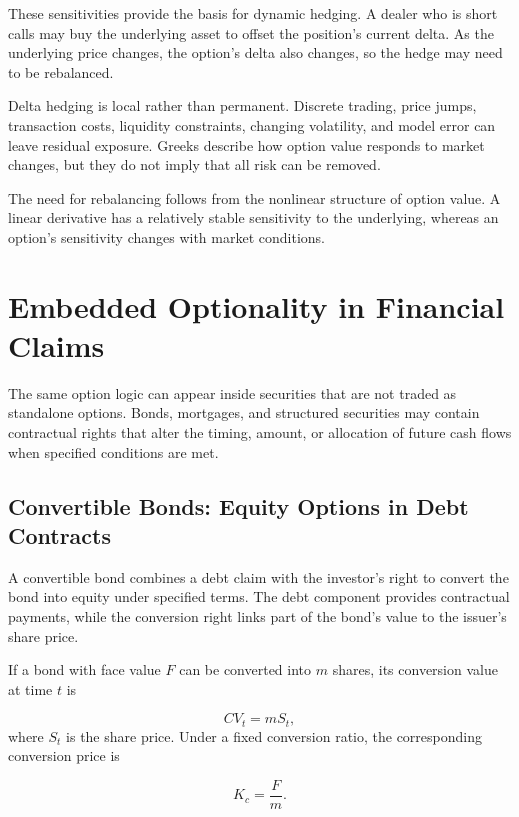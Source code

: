 These sensitivities provide the basis for dynamic hedging. A dealer who is short calls may buy the underlying asset to offset the position's current delta. As the underlying price changes, the option's delta also changes, so the hedge may need to be rebalanced.

Delta hedging is local rather than permanent. Discrete trading, price jumps, transaction costs, liquidity constraints, changing volatility, and model error can leave residual exposure. Greeks describe how option value responds to market changes, but they do not imply that all risk can be removed.

The need for rebalancing follows from the nonlinear structure of option value. A linear derivative has a relatively stable sensitivity to the underlying, whereas an option's sensitivity changes with market conditions.



\section{Embedded Optionality in Financial Claims}

The same option logic can appear inside securities that are not traded as standalone options. Bonds, mortgages, and structured securities may contain contractual rights that alter the timing, amount, or allocation of future cash flows when specified conditions are met.

\subsection{Convertible Bonds: Equity Options in Debt Contracts}

A convertible bond combines a debt claim with the investor's right to convert the bond into equity under specified terms. The debt component provides contractual payments, while the conversion right links part of the bond's value to the issuer's share price.

If a bond with face value \(F\) can be converted into \(m\) shares, its conversion value at time \(t\) is

\begin{equation}
CV_t=mS_t,
\label{eq:ch18-conversion-value}
\end{equation}
where \(S_t\) is the share price. Under a fixed conversion ratio, the corresponding conversion price is

\begin{equation}
K_c=\frac{F}{m}.
\label{eq:ch18-conversion-price}
\end{equation}

